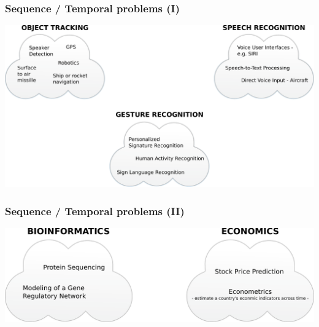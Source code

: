 

\begin{frame}
  \frametitle{Sequence / Temporal problems (I)}
  \includegraphics[width=\textwidth]{graphics/hmm-intro/time_series_problems_1.pdf}
\end{frame}

\begin{frame}
  \frametitle{Sequence / Temporal problems (II)}
  \includegraphics[width=\textwidth]{graphics/hmm-intro/time_series_problems_2.pdf}
\end{frame}


